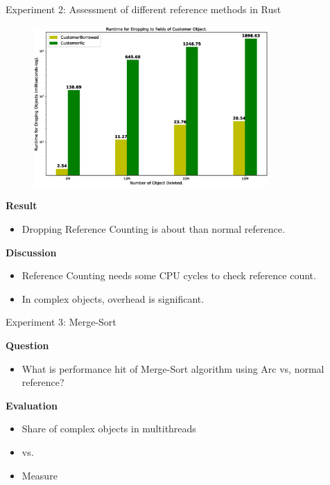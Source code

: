 \documentclass[9pt]{beamer}
\begin{document}
\begin{frame}[fragile]{Experiment 2: Assessment of different reference methods in Rust}
    \vspace{-0.5cm}
    \begin{figure}[hp]
        \centering
        \begin{center}
                \includegraphics[width=0.8\textwidth]{images/rust_droptime_borring_rc.eps}
                \captionsetup{labelformat=empty}
        \end{center}
    \end{figure}
\vspace{-0.5cm}
    \textbf{Result}
    \begin{itemize}
        \item Dropping Reference Counting is about  than normal reference.
    \end{itemize}
    \textbf{Discussion}
    \begin{itemize}
        \item Reference Counting needs some CPU cycles to check reference count.
        \item In complex objects, overhead is significant.
    \end{itemize}
\end{frame}


\begin{frame}[fragile]{Experiment 3: Merge-Sort}

    \textbf{Question}
    \begin{itemize}
        \item What is performance hit of Merge-Sort algorithm using Arc vs, normal reference?
    \end{itemize}

    \vspace{0.5cm}

    \textbf{Evaluation}
    \begin{itemize}
        \item Share  of complex objects in multithreads
        \item {} vs. 
        \item Measure 
    \end{itemize}
\end{frame}
\end{document}
